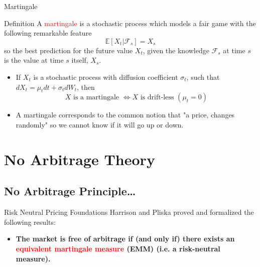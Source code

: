 \documentclass{beamer}
\begin{document}
\begin{frame}{Martingale}
	\begin{block}{Definition}
		A \textcolor{red}{martingale} is a stochastic process which models a fair game with the following remarkable feature
		\begin{equation}
			\mathbb{E}[X_t|\mathcal{F}_s] = X_s
		\end{equation}
		so the best prediction for the future value $X_t$, given the knowledge $\mathcal{F}_s$ at time $s$ is the value at time $s$ itself, $X_s$.
	\end{block}
	\begin{itemize}
	\item If $X_t$ is a stochastic process with diffusion coefficient $\sigma_t$, such that %
	$dX_t=\mu_t dt+\sigma_t dW_t$, then 
	\begin{equation*}
		X\text{ is a martingale } \iff X\text{ is drift-less } (\mu_t=0)
	\end{equation*}
	\item A martingale corresponds to the common notion that "a price, changes randomly" so we cannot know if it will go up or down.
\end{itemize}
\end{frame}
	
\section{No Arbitrage Theory}
\subsection{No Arbitrage Principle\ldots}

\begin{frame}{Risk Neutral Pricing Foundations}
	Harrison and Pliska proved and formalized the following results:
	\begin{itemize}
		\item \textbf{The market is free of arbitrage if (and only if) there exists an \textcolor{red}{equivalent martingale measure} (EMM) (i.e. a risk-neutral measure).}
	\end{itemize}
	\vfill
\end{frame}
\end{document}

